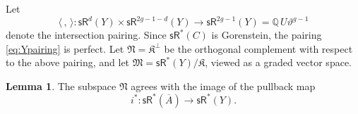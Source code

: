 \documentclass[11pt]{article}
\def\QQ{\mathbb{Q}}
\def\sR{\mathsf{sR}}
\newcommand{\barA}{\overline{A}}
\theoremstyle{definition}
\newtheorem{lemma}[definition]{Lemma}
\begin{document}
Let
\begin{equation}\label{eq:Ypairing}
    \langle \, ,\,\rangle : \sR^d(Y) \times \sR^{2g-1-d}(Y)  \to \sR^{2g-1}(Y) = \QQ \,U \vartheta^{g-1} 
\end{equation}
denote the intersection pairing. Since $\sR^*(C)$ is Gorenstein, the pairing \eqref{eq:Ypairing} is perfect. Let $\mathfrak N = \mathfrak K ^\perp$
be the orthogonal complement with respect to the above pairing, and let $\mathfrak M = \sR^*(Y)/\mathfrak K$, viewed as a graded vector space.

\begin{lemma}\label{lem:normalization-pairing}
    The subspace $\mathfrak N$ agrees with the image of the pullback map
    $$
    i^* : \sR^*(\barA) \to \sR^*(Y).
    $$
\end{lemma}
\end{document}
